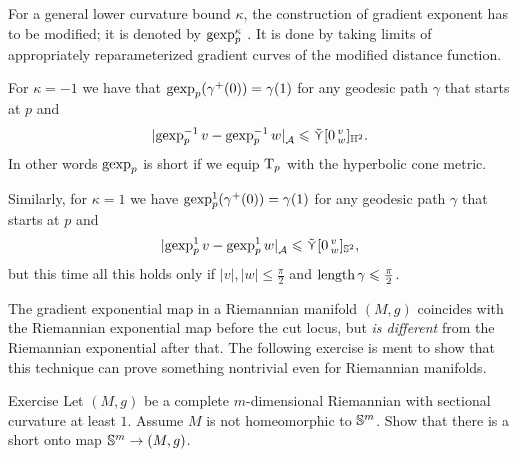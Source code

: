 For a general lower curvature bound $\kappa$, the construction of gradient exponent has to be modified;
it is denoted by $\operatorname{\rm gexp}\nolimits_p^\kappa$ \cite[16.36]{alexander-kapovitch-petrunin2024}. It is done by taking limits of appropriately reparameterized gradient curves of  the modified distance function.

For $\kappa=-1$ we have 
that $\operatorname{\rm gexp}\nolimits_p(\gamma^+(0))=\gamma(1)$
for any geodesic path $\gamma$ that starts at $p$
and 
\[|{\operatorname{\rm gexp}\nolimits_p^{-1}v}-{\operatorname{\rm gexp}\nolimits_p^{-1}w}|_{\mathcal{A}}^{{}}\leqslant \mathop{\tilde\curlyvee}\nolimits[0\,{}^{v}_{w}]_{\mathbb{H}^2}.\]
In other words $\operatorname{\rm gexp}\nolimits_p$ is short if we equip $\mathrm{T}_p$ with the hyperbolic cone metric.

Similarly, for $\kappa=1$ we have $\operatorname{\rm gexp}\nolimits_p^1(\gamma^+(0))=\gamma(1)$
for any geodesic path $\gamma$ that starts at $p$ and 
\[|{\operatorname{\rm gexp}\nolimits_p^{1}v}-{\operatorname{\rm gexp}\nolimits_p^{1}w}|_{\mathcal{A}}^{{}}\leqslant \mathop{\tilde\curlyvee}\nolimits[0\,{}^{v}_{w}]_{\mathbb{S}^2},\]
but this time all this holds only if $|v|,|w|\le\tfrac\pi2$ and $\mathop{\rm length}\nolimits\gamma\leqslant\tfrac\pi2$.

The gradient exponential map in a Riemannian manifold $(M,g)$ coincides with the Riemannian exponential map before the cut locus, but \textit{is different} from the  Riemannian exponential after that.
The following exercise is ment to show that this technique can prove something nontrivial even for Riemannian manifolds.

\begin{thm}{Exercise}\label{ex:short-onto}
Let $(M,g)$ be a complete $m$-dimensional Riemannian with sectional curvature at least $1$.
Assume $M$ is not homeomorphic to $\mathbb{S}^m$.
Show that there is a short onto map $\mathbb{S}^m\to (M,g)$.
\end{thm}
